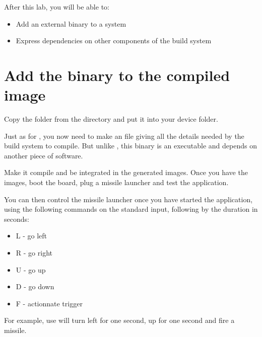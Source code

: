 
After this lab, you will be able to:
\begin{itemize}
  \item Add an external binary to a system
  \item Express dependencies on other components of the build system
\end{itemize}

\section{Add the binary to the compiled image}
Copy the  folder from the
 directory and put it into your
device folder.


Just as for , you now need to make an  file
giving all the details needed by the build system to compile. But
unlike , this binary is an executable and depends on another
piece of software.

Make it compile and be integrated in the generated images. Once you
have the images, boot the board, plug a missile launcher and test the
application.

You can then control the missile launcher once you have started the
 application, using the following commands on the
standard input, following by the duration in seconds:
\begin{itemize}
	\item L - go left
	\item R - go right
	\item U - go up
	\item D - go down
	\item F - actionnate trigger
\end{itemize}

For example, use  will turn left for one second, up
for one second and fire a missile.
